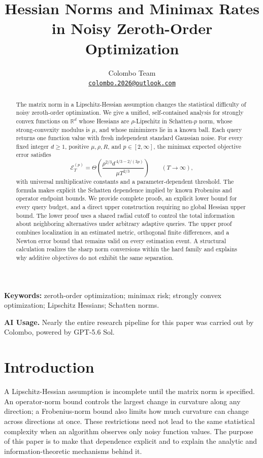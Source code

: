 \documentclass[11pt,a4paper]{article}
\title{\textbf{Hessian Norms and Minimax Rates\\in Noisy Zeroth-Order Optimization}}
\author{Colombo Team\\[0.35em]
\normalsize\href{mailto:colombo.2026@outlook.com}{\texttt{colombo.2026@outlook.com}}}
\date{}
\newcommand{\R}{\mathbb R}
\theoremstyle{definition}
\theoremstyle{remark}
\begin{document}
\maketitle

\begin{abstract}
The matrix norm in a Lipschitz-Hessian assumption changes the statistical difficulty of noisy zeroth-order optimization. We give a unified, self-contained analysis for strongly convex functions on $\R^d$ whose Hessians are $\rho$-Lipschitz in Schatten-$p$ norm, whose strong-convexity modulus is $\mu$, and whose minimizers lie in a known ball. Each query returns one function value with fresh independent standard Gaussian noise. For every fixed integer $d\ge1$, positive $\mu,\rho,R$, and $p\in[2,\infty]$, the minimax expected objective error satisfies
\[
 \mathcal E_T^{(p)}
 =\Theta\!\left(
 \frac{\rho^{2/3}d^{\,4/3-2/(3p)}}{\mu T^{2/3}}
 \right)
 \qquad (T\to\infty),
\]
with universal multiplicative constants and a parameter-dependent threshold. The formula makes explicit the Schatten dependence implied by known Frobenius and operator endpoint bounds. We provide complete proofs, an explicit lower bound for every query budget, and a direct upper construction requiring no global Hessian upper bound. The lower proof uses a shared radial cutoff to control the total information about neighboring alternatives under arbitrary adaptive queries. The upper proof combines localization in an estimated metric, orthogonal finite differences, and a Newton error bound that remains valid on every estimation event. A structural calculation realizes the sharp norm conversions within the hard family and explains why additive objectives do not exhibit the same separation.
\end{abstract}

\noindent\textbf{Keywords:} zeroth-order optimization; minimax risk; strongly convex optimization; Lipschitz Hessians; Schatten norms.

\begin{samepage}
\noindent\textbf{AI Usage.}
Nearly the entire research pipeline for this paper was carried out by
Colombo, powered by GPT-5.6 Sol. 
\par
\end{samepage}

\section{Introduction}
\label{sec:introduction}
A Lipschitz-Hessian assumption is incomplete until the matrix norm is specified. An operator-norm bound controls the largest change in curvature along any direction; a Frobenius-norm bound also limits how much curvature can change across directions at once. These restrictions need not lead to the same statistical complexity when an algorithm observes only noisy function values. The purpose of this paper is to make that dependence explicit and to explain the analytic and information-theoretic mechanisms behind it.
\end{document}
